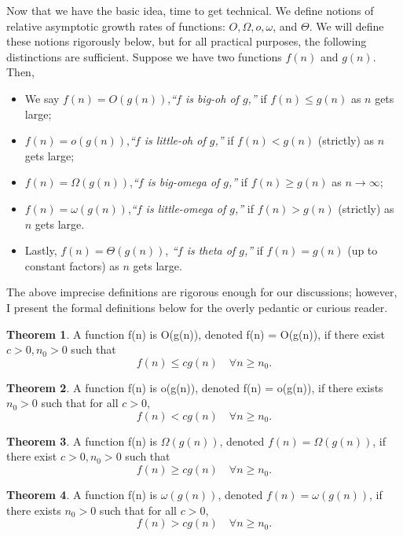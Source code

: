 \documentclass[12pt,twoside]{reedthesis}
\theoremstyle{definition}
\newtheorem{theorem}{Theorem}[chapter]
\begin{document}
Now that we have the basic idea, time to get technical. We define notions of relative asymptotic growth rates of functions: $O, \Omega, o, \omega$, and $\Theta$. We will define these notions rigorously below, but for all practical purposes, the following distinctions are sufficient. Suppose we have two functions $f(n)$ and $g(n)$. Then, 
\begin{itemize}
\item We say $f(n) = O(g(n))$,\textit{``$f$ is big-oh of $g$,''} if $f(n) \leq g(n)$ as $n$ gets large;
\item $f(n) = o(g(n))$,\textit{``$f$ is little-oh of $g$,''} if $f(n) < g(n)$ (strictly) as $n$ gets large;
\item $f(n) = \Omega(g(n))$,\textit{``$f$ is big-omega of $g$,''} if $f(n) \geq g(n)$ as $n \rightarrow \infty$;
\item $f(n) = \omega(g(n))$,\textit{``$f$ is little-omega of $g$,''} if $f(n) > g(n)$ (strictly) as $n$ gets large.
\item Lastly, $f(n) = \Theta(g(n))$, \textit{``$f$ is theta of $g$,''} if $f(n) = g(n)$ (up to constant factors) as $n$ gets large.
\end{itemize}
The above imprecise definitions are rigorous enough for our discussions; however, I present the formal definitions below for the overly pedantic or curious reader. 
 
\begin{theorem}
A function f(n) is O(g(n)), denoted f(n) = O(g(n)), if there exist $c>0, n_0>0$ such that
$$f(n) \leq c g(n) \quad \forall n\geq n_0.$$
\end{theorem}

\begin{theorem}
A function f(n) is o(g(n)), denoted f(n) = o(g(n)), if there exists $n_0>0$ such that for all $c>0$,
$$f(n) < c g(n) \quad \forall n\geq n_0.$$
\end{theorem}

\begin{theorem}
A function f(n) is $\Omega(g(n))$, denoted $f(n) = \Omega(g(n))$, if there exist $c>0, n_0>0$ such that
$$f(n) \geq c g(n) \quad \forall n\geq n_0.$$
\end{theorem}

\begin{theorem}
A function f(n) is $\omega(g(n))$, denoted $f(n) = \omega(g(n))$, if there exists $n_0>0$ such that for all $c>0$,
$$f(n) > c g(n) \quad \forall n\geq n_0.$$
\end{theorem}
\end{document}
